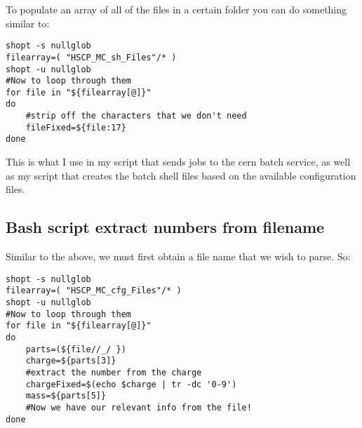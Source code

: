 \documentclass[11pt]{article}
\begin{document}
To populate an array of all of the files in a certain folder you
can do something similar to:
\begin{verbatim}
shopt -s nullglob
filearray=( "HSCP_MC_sh_Files"/* )
shopt -u nullglob
#Now to loop through them
for file in "${filearray[@]}"
do
    #strip off the characters that we don't need
    fileFixed=${file:17}
done
\end{verbatim}
This is what I use in my script that sends jobs to the cern batch
service, as well as my script that creates the batch shell files
based on the available configuration files.
\subsection{Bash script extract numbers from filename}
\label{sec-3-2}

Similar to the above, we must first obtain a file name that we wish
to parse. So:
\begin{verbatim}
shopt -s nullglob
filearray=( "HSCP_MC_cfg_Files"/* )
shopt -u nullglob
#Now to loop through them
for file in "${filearray[@]}"
do
    parts=(${file//_/ })
    charge=${parts[3]}
    #extract the number from the charge
    chargeFixed=$(echo $charge | tr -dc '0-9')
    mass=${parts[5]}
    #Now we have our relevant info from the file!
done
\end{verbatim}
\end{document}
